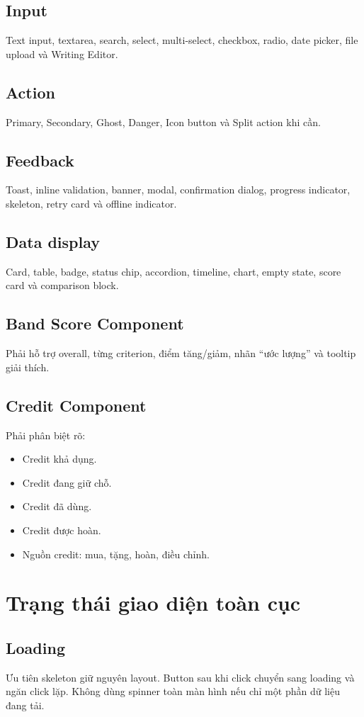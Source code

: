 \documentclass[11pt,a4paper]{article}
\begin{document}
\subsection{Input}
Text input, textarea, search, select, multi-select, checkbox, radio, date picker, file upload và Writing Editor.

\subsection{Action}
Primary, Secondary, Ghost, Danger, Icon button và Split action khi cần.

\subsection{Feedback}
Toast, inline validation, banner, modal, confirmation dialog, progress indicator, skeleton, retry card và offline indicator.

\subsection{Data display}
Card, table, badge, status chip, accordion, timeline, chart, empty state, score card và comparison block.

\subsection{Band Score Component}
Phải hỗ trợ overall, từng criterion, điểm tăng/giảm, nhãn ``ước lượng'' và tooltip giải thích.

\subsection{Credit Component}
Phải phân biệt rõ:
\begin{itemize}
  \item Credit khả dụng.
  \item Credit đang giữ chỗ.
  \item Credit đã dùng.
  \item Credit được hoàn.
  \item Nguồn credit: mua, tặng, hoàn, điều chỉnh.
\end{itemize}

\section{Trạng thái giao diện toàn cục}

\subsection{Loading}
Ưu tiên skeleton giữ nguyên layout. Button sau khi click chuyển sang loading và ngăn click lặp. Không dùng spinner toàn màn hình nếu chỉ một phần dữ liệu đang tải.
\end{document}
